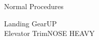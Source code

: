 \documentclass[11pt,twocolumn,letterpaper]{article}
\newcommand*{\protitle}[1]{{\Large\sf#1}} %
\newcommand*{\proitem}[2]{#1\dotfill#2} %
\begin{document}
\begin{center}

	\protitle{Normal Procedures}

	\vspace{0.1in}

	\proitem{Landing Gear}{UP}\\
	\proitem{Elevator Trim}{NOSE HEAVY}

\end{center}
\end{document}
